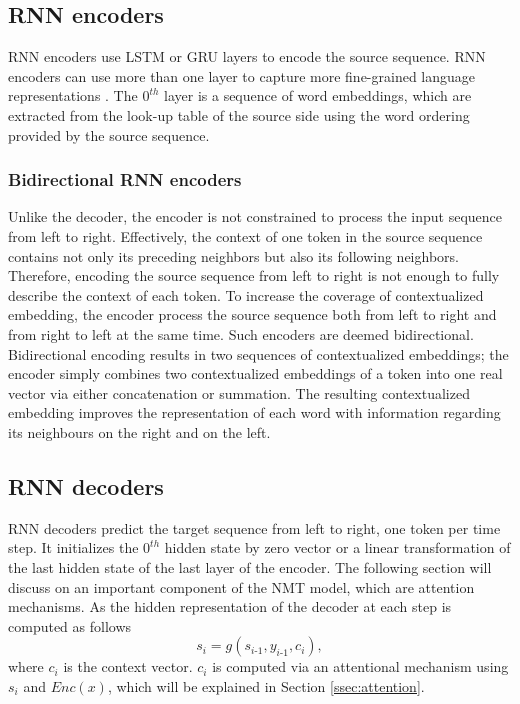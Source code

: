 \subsection{RNN encoders}
RNN encoders use LSTM or GRU layers to encode the source sequence. RNN encoders can use more than one layer to capture more fine-grained language representations \citep{Li20shallow}. The $0^{th}$ layer is a sequence of word embeddings, which are extracted from the look-up table of the source side using the word ordering provided by the source sequence. 

\subsubsection{Bidirectional RNN encoders}
Unlike the decoder, the encoder is not constrained to process the input sequence from left to right. Effectively, the context of one token in the source sequence contains not only its preceding neighbors but also its following neighbors. Therefore, encoding the source sequence from left to right is not enough to fully describe the context of each token. To increase the coverage of contextualized embedding, the encoder process the source sequence both from left to right and from right to left at the same time. Such encoders are deemed bidirectional. Bidirectional encoding results in two sequences of contextualized embeddings; the encoder simply combines two contextualized embeddings of a token into one real vector via either concatenation or summation. The resulting contextualized embedding improves the representation of each word with information regarding its neighbours on the right and on the left.
\subsection{RNN decoders}
RNN decoders predict the target sequence from left to right, one token per time step. It initializes the $0^{th}$ hidden state by zero vector or a linear transformation of the last hidden state of the last layer of the encoder. The following section will discuss on an important component of the NMT model, which are attention mechanisms. As the hidden representation of the decoder at each step is computed as follows
\begin{equation}
s_i = g(s_{i\text{-}1},y_{i\text{-}1},c_i),
\end{equation}
where $c_i$ is the context vector. $c_i$ is computed via an attentional mechanism using $s_i$ and $Enc(x)$, which will be explained in Section \ref{ssec:attention}.

